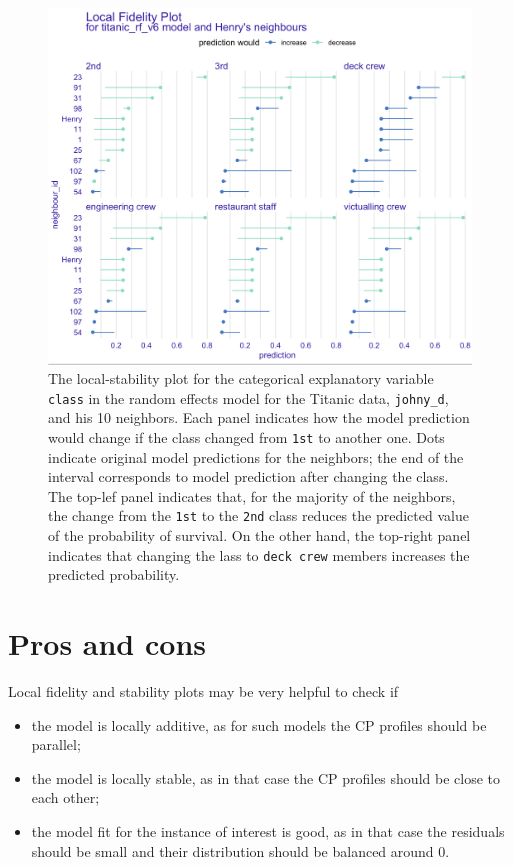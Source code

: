 \documentclass[]{krantz}
\providecommand{\tightlist}{%
  \setlength{\itemsep}{0pt}\setlength{\parskip}{0pt}}
\begin{document}
\begin{figure}

{\centering \includegraphics[width=0.7\linewidth]{figure/cp_fidelity_2} 

}

\caption{The local-stability plot for the categorical explanatory variable \texttt{class} in the random effects model for the Titanic data, \texttt{johny\_d}, and his 10 neighbors. Each panel indicates how the model prediction would change if the class changed from \texttt{1st} to another one. Dots indicate original model predictions for the neighbors; the end of the interval corresponds to model prediction after changing the class. The top-lef panel indicates that, for the majority of the neighbors, the change from the \texttt{1st} to the \texttt{2nd} class reduces the predicted value of the probability of survival. On the other hand, the top-right panel indicates that changing the lass to \texttt{deck\ crew} members increases the predicted probability.}\label{fig:localFidelityPlots2}
\end{figure}

\hypertarget{cPLocDiagProsCons}{%
\section{Pros and cons}\label{cPLocDiagProsCons}}

Local fidelity and stability plots may be very helpful to check if

\begin{itemize}
\tightlist
\item
  the model is locally additive, as for such models the CP profiles should be parallel;
\item
  the model is locally stable, as in that case the CP profiles should be close to each other;
\item
  the model fit for the instance of interest is good, as in that case the residuals should be small and their distribution should be balanced around 0.
\end{itemize}
\end{document}

